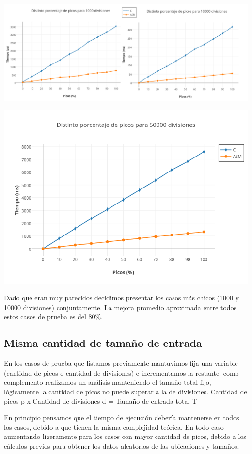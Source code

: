 \centerline{\includegraphics[scale=0.45]{imagenes/distintosPicosParaDivisiones.png}}

\includegraphics[scale=0.6]{imagenes/distintosPicos50000divisiones.png} 

Dado que eran muy parecidos decidimos presentar los casos más chicos (1000 y 10000 divisiones) conjuntamente. La mejora promedio aproximada entre todos estos casos de prueba es del 80$\%$.

\newpage
\subsection{Misma cantidad de tamaño de entrada}

En los casos de prueba que listamos previamente mantuvimos fija una variable (cantidad de picos o cantidad de divisiones) e incrementamos la restante, como complemento realizamos un análisis manteniendo el tamaño total fijo, lógicamente la cantidad de picos no puede superar a la de divisiones.
Cantidad de picos p x Cantidad de divisiones d = Tamaño de entrada total T

En principio pensamos que el tiempo de ejecución debería mantenerse en todos los casos, debido a que tienen la misma complejidad teórica. En todo caso aumentando ligeramente para los casos con mayor cantidad de picos, debido a los cálculos previos para obtener los datos aleatorios de las ubicaciones y tamaños.

